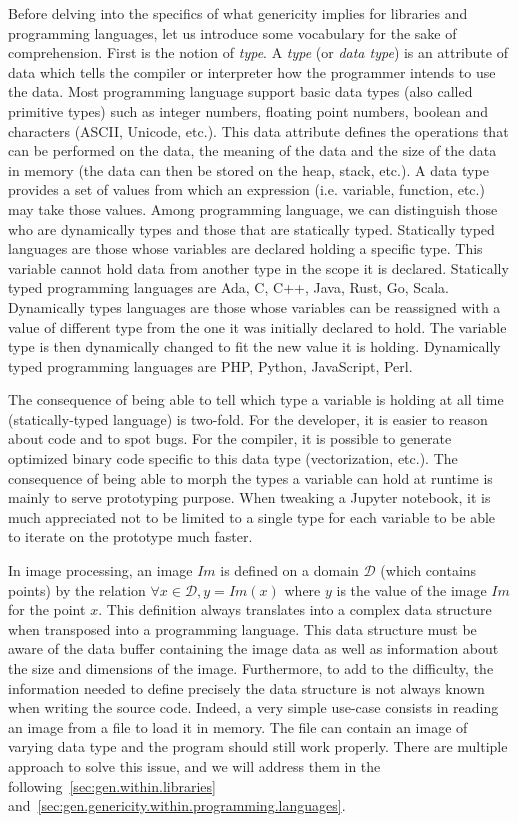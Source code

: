Before delving into the specifics of what genericity implies for libraries and programming languages, let us introduce
some vocabulary for the sake of comprehension. First is the notion of \emph{type}. A \emph{type} (or \emph{data type})
is an attribute of data which tells the compiler or interpreter how the programmer intends to use the data. Most
programming language support basic data types (also called primitive types) such as integer numbers, floating point
numbers, boolean and characters (ASCII, Unicode, etc.). This data attribute defines the operations that can be performed
on the data, the meaning of the data and the size of the data in memory (the data can then be stored on the heap, stack,
etc.). A data type provides a set of values from which an expression (i.e. variable, function, etc.) may take those
values. Among programming language, we can distinguish those who are dynamically types and those that are statically
typed. Statically typed languages are those whose variables are declared holding a specific type. This variable cannot
hold data from another type in the scope it is declared. Statically typed programming languages are Ada, C, C++, Java,
Rust, Go, Scala. Dynamically types languages are those whose variables can be reassigned with a value of different type
from the one it was initially declared to hold. The variable type is then dynamically changed to fit the new value it is
holding. Dynamically typed programming languages are PHP, Python, JavaScript, Perl.

The consequence of being able to tell which type a variable is holding at all time (statically-typed language) is
two-fold. For the developer, it is easier to reason about code and to spot bugs. For the compiler, it is possible to
generate optimized binary code specific to this data type (vectorization, etc.). The consequence of being able to morph
the types a variable can hold at runtime is mainly to serve prototyping purpose. When tweaking a Jupyter notebook, it is
much appreciated not to be limited to a single type for each variable to be able to iterate on the prototype much
faster.

In image processing, an image \(Im\) is defined on a domain \(\mathcal{D}\) (which contains points) by the relation
\(\forall x \in \mathcal{D}, y = Im(x)\) where \(y\) is the value of the image \(Im\) for the point \(x\). This
definition always translates into a complex data structure when transposed into a programming language. This data
structure must be aware of the data buffer containing the image data as well as information about the size and
dimensions of the image. Furthermore, to add to the difficulty, the information needed to define precisely the data
structure is not always known when writing the source code. Indeed, a very simple use-case consists in reading an image
from a file to load it in memory. The file can contain an image of varying data type and the program should still work
properly. There are multiple approach to solve this issue, and we will address them in the
following~\cref{sec:gen.within.libraries} and~\cref{sec:gen.genericity.within.programming.languages}.



